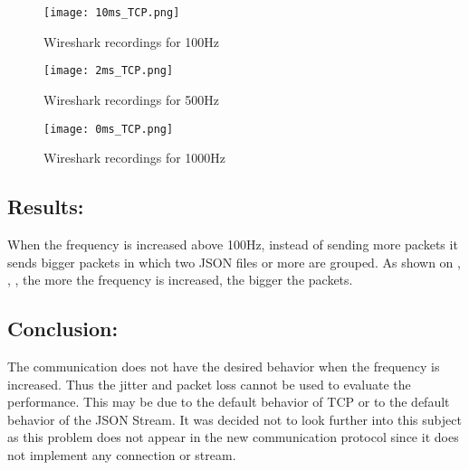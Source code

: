 	\begin{figure}[h]
		\centering
		\texttt{[image: 10ms\_TCP.png]}
		\caption{Wireshark recordings for 100Hz}
		\label{fig:10ms_tcp}
	\end{figure}
	\begin{figure}[h]
		\centering
		\texttt{[image: 2ms\_TCP.png]}
		\caption{Wireshark recordings for 500Hz}
		\label{fig:2ms_tcp}
	\end{figure}
	\begin{figure}[h]
		\centering
		\texttt{[image: 0ms\_TCP.png]}
		\caption{Wireshark recordings for 1000Hz}
		\label{fig:0ms_tcp}
	\end{figure}


\subsection*{Results:}

When the frequency is increased above 100Hz, instead of sending more packets it sends bigger packets in which two \gls{JSON} files or more are grouped. As shown on , , , the more the frequency is increased, the bigger the packets. 

\subsection*{Conclusion:}

The communication does not have the desired behavior when the frequency is increased. Thus the jitter and packet loss cannot be used to evaluate the performance. This may be due to the default behavior of TCP or to the default behavior of the JSON Stream. It was decided not to look further into this subject as this problem does not appear in the new communication protocol since it does not implement any connection or stream.